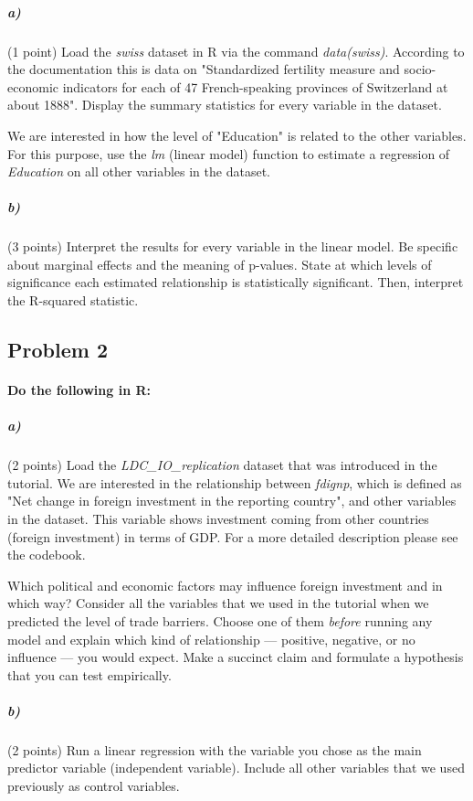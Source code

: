 \documentclass[12pt]{article}
\begin{document}
\subparagraph{a)} (1 point) Load the \textit{swiss} dataset in R via the command \textit{data(swiss)}. According to the documentation this is data on "Standardized fertility measure and socio-economic indicators for each of 47 French-speaking provinces of Switzerland at about 1888". Display the summary statistics for every variable in the dataset.

We are interested in how the level of "Education" is related to the other variables. For this purpose, use the \textit{lm} (linear model) function to estimate a regression of \textit{Education} on all other variables in the dataset.

\subparagraph{b)} (3 points) Interpret the results for every variable in the linear model. Be specific about marginal effects and the meaning of p-values. State at which levels of significance each estimated relationship is statistically significant. Then, interpret the R-squared statistic.



\subsection*{Problem 2}

\paragraph{Do the following in R:}

\subparagraph{a)} (2 points) Load the \textit{LDC\_IO\_replication} dataset that was introduced in the tutorial. We are interested in the relationship between \textit{fdignp}, which is defined as "Net change in foreign investment in the reporting country", and other variables in the dataset. This variable shows investment coming from other countries (foreign investment) in terms of GDP. For a more detailed description please see the codebook.

Which political and economic factors may influence foreign investment and in which way? Consider all the variables that we used in the tutorial when we predicted the level of trade barriers. Choose one of them \textit{before} running any model and explain which kind of relationship --- positive, negative, or no influence --- you would expect. Make a succinct claim and formulate a hypothesis that you can test empirically.

\subparagraph{b)} (2 points) Run a linear regression with the variable you chose as the main predictor variable (independent variable). Include all other variables that we used previously as control variables.
\end{document}
